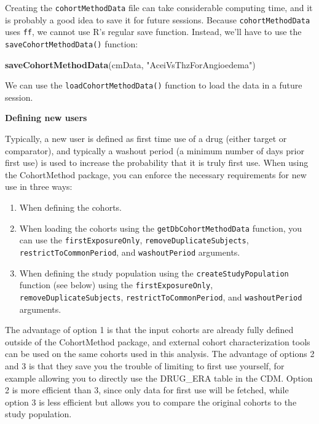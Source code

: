 \documentclass[11pt]{book}
\newenvironment{Shaded}{\begin{snugshade}}{\end{snugshade}}
\newcommand{\KeywordTok}[1]{\textcolor[rgb]{0.13,0.29,0.53}{\textbf{#1}}}
\newcommand{\NormalTok}[1]{#1}
\newcommand{\StringTok}[1]{\textcolor[rgb]{0.31,0.60,0.02}{#1}}
\providecommand{\tightlist}{%
  \setlength{\itemsep}{0pt}\setlength{\parskip}{0pt}}
\theoremstyle{definition}
\theoremstyle{definition}
\theoremstyle{definition}
\theoremstyle{remark}
\begin{document}
Creating the \texttt{cohortMethodData} file can take considerable computing time, and it is probably a good idea to save it for future sessions. Because \texttt{cohortMethodData} uses \texttt{ff}, we cannot use R's regular save function. Instead, we'll have to use the \texttt{saveCohortMethodData()} function:

\begin{Shaded}
\begin{Highlighting}[]
\KeywordTok{saveCohortMethodData}\NormalTok{(cmData, }\StringTok{"AceiVsThzForAngioedema"}\NormalTok{)}
\end{Highlighting}
\end{Shaded}

We can use the \texttt{loadCohortMethodData()} function to load the data in a future session.

\textbf{Defining new users}

Typically, a new user is defined as first time use of a drug (either target or comparator), and typically a washout period (a minimum number of days prior first use) is used to increase the probability that it is truly first use. When using the CohortMethod package, you can enforce the necessary requirements for new use in three ways:

\begin{enumerate}
\def\labelenumi{\arabic{enumi}.}
\tightlist
\item
  When defining the cohorts.
\item
  When loading the cohorts using the \texttt{getDbCohortMethodData} function, you can use the \texttt{firstExposureOnly}, \texttt{removeDuplicateSubjects}, \texttt{restrictToCommonPeriod}, and \texttt{washoutPeriod} arguments.
\item
  When defining the study population using the \texttt{createStudyPopulation} function (see below) using the \texttt{firstExposureOnly}, \texttt{removeDuplicateSubjects}, \texttt{restrictToCommonPeriod}, and \texttt{washoutPeriod} arguments.
\end{enumerate}

The advantage of option 1 is that the input cohorts are already fully defined outside of the CohortMethod package, and external cohort characterization tools can be used on the same cohorts used in this analysis. The advantage of options 2 and 3 is that they save you the trouble of limiting to first use yourself, for example allowing you to directly use the DRUG\_ERA table in the CDM. Option 2 is more efficient than 3, since only data for first use will be fetched, while option 3 is less efficient but allows you to compare the original cohorts to the study population.
\end{document}
